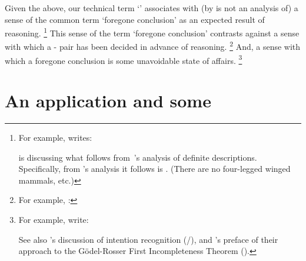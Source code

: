 \begin{note}
  Given the above, our technical term `\fc{}' associates with (by is not an analysis of) a sense of the common term `foregone conclusion' as an expected result of reasoning.%
  \footnote{
    For example, \textcite[6]{Jacquette:2002up} writes:

      \citeauthor{Jacquette:2002up} is discussing what follows from~\citeauthor{Russell:1905aa}'s analysis of definite descriptions.
    Specifically, from \citeauthor{Russell:1905aa}'s analysis it follows  is .
    (There are no four-legged winged mammals, etc.)
  }
  This sense of the term `foregone conclusion' contrasts against a sense with which a - pair has been decided in advance of reasoning.%
  \footnote{
    For example, \textcite[1228]{Kadane:1996vu}:
  }
  And, a sense with which a foregone conclusion is some unavoidable state of affairs.%
  \footnote{
    For example, \textcite[332--333]{kurufushamashii:2015un} write:

    See also \citeauthor{Grice:1957vg}'s discussion of intention recognition (\citeyear[385]{Grice:1957vg}/\citeyear[219]{Grice:1989uf}), and \citeauthor{Machover:1996vu}'s preface of their approach to the G\"{o}del-Rosser First Incompleteness Theorem (\citeyear[viii]{Machover:1996vu}).
  }
\end{note}



\section{An application and some }

